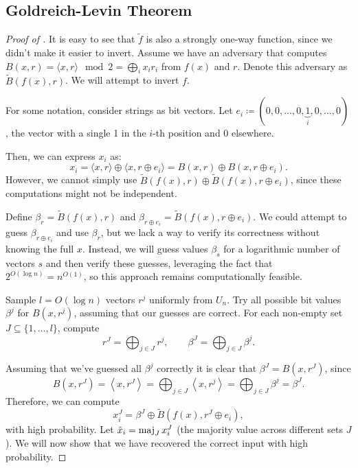 
\subsection{Goldreich-Levin Theorem}
\goldreichlevin*
\begin{proof}[Proof of ] \label{proof:goldreich_levin}
	It is easy to see that $\tilde f$ is also a strongly one-way function, since we didn't make it easier to invert.
    Assume we have an adversary that computes $B(x, r) = \langle x, r \rangle \mod 2 = \bigoplus_i x_i r_i$ from $f(x)$ and $r$. 
    Denote this adversary as $\tilde{B}(f(x), r)$.
    We will attempt to invert $f$.

    For some notation, consider strings as bit vectors.
    Let $e_i \coloneqq (0, 0, \ldots, 0, \underbrace{1}_i, 0, \ldots, 0)$, the vector with a single 1 in the $i$-th position and 0 elsewhere.

    Then, we can express $x_i$ as:
    \[
        x_i = \langle x, r \rangle \oplus \langle x, r \oplus e_i \rangle = B(x, r) \oplus B(x, r \oplus e_i).
    \] 
    However, we cannot simply use $\tilde{B}(f(x), r) \oplus \tilde{B}(f(x), r \oplus e_i)$, since these computations might not be independent.

    Define $\beta_r = \tilde{B}(f(x), r)$ and $\beta_{r \oplus e_i} = \tilde{B}(f(x), r \oplus e_i)$.
    We could attempt to guess $\beta_{r \oplus e_i}$ and use $\beta_r$, but we lack a way to verify its correctness without knowing the full $x$.
    Instead, we will guess values $\beta_s$ for a logarithmic number of vectors $s$ and then verify these guesses, leveraging the fact that $2^{O(\log n)} = n^{O(1)}$, so this approach remains computationally feasible.

    Sample $l = O(\log n)$ vectors $r^j$ uniformly from $U_n$.
    Try all possible bit values $\beta^j$ for $B(x, r^j)$, assuming that our guesses are correct.
    For each non-empty set $J \subseteq \{1, \ldots, l\}$, compute
    \[
        r^J = \bigoplus_{j \in J} r^j, \qquad \beta^J = \bigoplus_{j \in J} \beta^j.
    \] 

	Assuming that we've guessed all $\beta^{j}$ correctly it is clear that $\beta^{J} = B(x, r^{J})$, since
	\[
		B(x, r^{J}) = \left< x, r^{J} \right> = \bigoplus_{j \in J} \left< x, r^{j} \right> = \bigoplus_{j \in J} \beta^{j} = \beta^{J}
	.\] 
    Therefore, we can compute 
    \[
        x_{i}^J = \beta^J \oplus \tilde{B}(f(x), r^J \oplus e_i),
    \] with high probability.
    Let $\tilde{x}_i = \operatorname{maj}\limits_J x_i^J$ (the majority value across different sets $J$).
    We will now show that we have recovered the correct input with high probability.


\end{proof}
